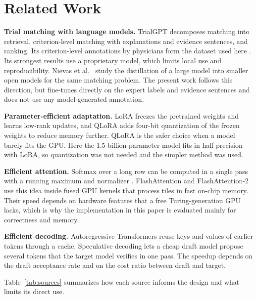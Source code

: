 \documentclass[conference]{IEEEtran}
\begin{document}
\section{Related Work}\label{sec:related}
\textbf{Trial matching with language models.} TrialGPT \cite{trialgpt} decomposes matching into retrieval, criterion-level matching with explanations and evidence sentences, and ranking. Its criterion-level annotations by physicians form the dataset used here \cite{dataset}. Its strongest results use a proprietary model, which limits local use and reproducibility. Nievas et al.\ \cite{nievas} study the distillation of a large model into smaller open models for the same matching problem. The present work follows this direction, but fine-tunes directly on the expert labels and evidence sentences and does not use any model-generated annotation.

\textbf{Parameter-efficient adaptation.} LoRA \cite{lora} freezes the pretrained weights and learns low-rank updates, and QLoRA \cite{qlora} adds four-bit quantization of the frozen weights to reduce memory further. QLoRA is the safer choice when a model barely fits the GPU. Here the 1.5-billion-parameter model fits in half precision with LoRA, so quantization was not needed and the simpler method was used.

\textbf{Efficient attention.} Softmax over a long row can be computed in a single pass with a running maximum and normalizer \cite{onlinesoftmax}. FlashAttention \cite{flash1} and FlashAttention-2 \cite{flash2} use this idea inside fused GPU kernels that process tiles in fast on-chip memory. Their speed depends on hardware features that a free Turing-generation GPU lacks, which is why the implementation in this paper is evaluated mainly for correctness and memory.

\textbf{Efficient decoding.} Autoregressive Transformers \cite{vaswani} reuse keys and values of earlier tokens through a cache. Speculative decoding \cite{specdec,specsamp} lets a cheap draft model propose several tokens that the target model verifies in one pass. The speedup depends on the draft acceptance rate and on the cost ratio between draft and target.

Table~\ref{tab:sources} summarizes how each source informs the design and what limits its direct use.
\end{document}
